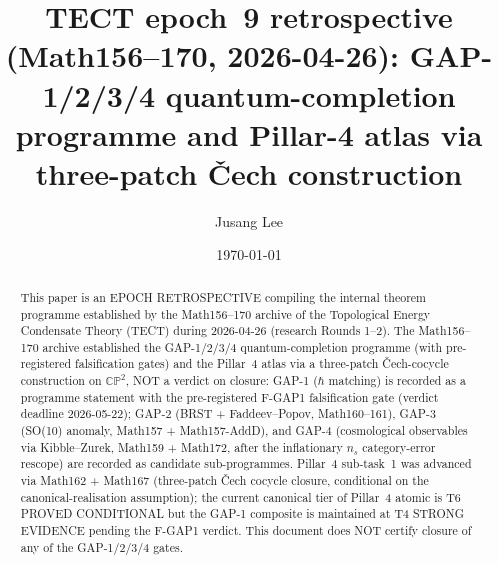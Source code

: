 



\title{TECT epoch~9 retrospective (Math156--170, 2026-04-26):
GAP-1/2/3/4 quantum-completion programme and Pillar-4 atlas via
three-patch \v{C}ech construction}

\author{Jusang Lee}

\date{\today}

\begin{abstract}
This paper is an EPOCH RETROSPECTIVE compiling the internal theorem
programme established by the Math156--170 archive of the Topological
Energy Condensate Theory (TECT) during 2026-04-26 (research
Rounds 1--2). The Math156--170 archive established the GAP-1/2/3/4
quantum-completion programme (with pre-registered falsification
gates) and the Pillar~4 atlas via a three-patch \v{C}ech-cocycle
construction on $\mathbb{CP}^2$, NOT a verdict on closure: GAP-1
($\hbar$ matching) is recorded as a programme statement with the
pre-registered F-GAP1 falsification gate (verdict deadline
2026-05-22); GAP-2 (BRST + Faddeev--Popov, Math160--161), GAP-3
(SO(10) anomaly, Math157 + Math157-AddD), and GAP-4 (cosmological
observables via Kibble--Zurek, Math159 + Math172, after the
inflationary $n_s$ category-error rescope) are recorded as
candidate sub-programmes. Pillar~4 sub-task~1 was advanced via
Math162 + Math167 (three-patch \v{C}ech cocycle closure, conditional
on the canonical-realisation assumption); the current canonical tier
of Pillar~4 atomic is T6 PROVED CONDITIONAL but the GAP-1 composite
is maintained at T4 STRONG EVIDENCE pending the F-GAP1 verdict.
This document does NOT certify closure of any of the GAP-1/2/3/4
gates.
\end{abstract}

